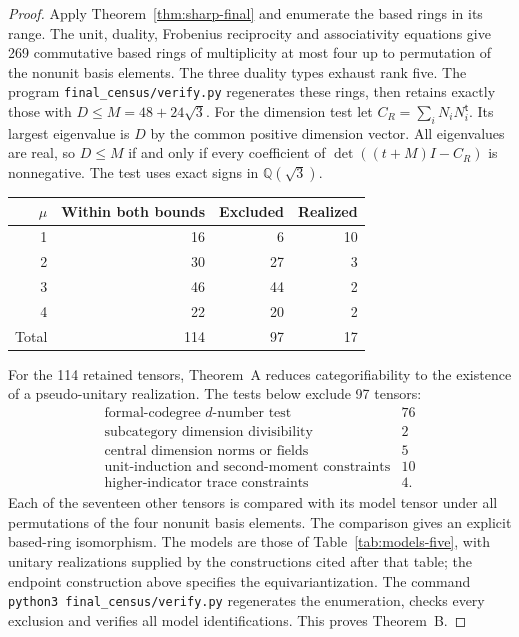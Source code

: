 \documentclass[11pt,a4paper]{article}
\numberwithin{equation}{section}
\begin{document}
\begin{proof}
Apply Theorem~\ref{thm:sharp-final} and enumerate the based rings in its range. The unit, duality, Frobenius reciprocity and associativity equations give 269 commutative based rings of multiplicity at most four up to permutation of the nonunit basis elements. The three duality types exhaust rank five. The program \texttt{final\_census/verify.py} regenerates these rings, then retains exactly those with $D\le M=48+24\sqrt3$. For the dimension test let $C_R=\sum_i N_iN_i^{\mathsf t}$. Its largest eigenvalue is $D$ by the common positive dimension vector. All eigenvalues are real, so $D\le M$ if and only if every coefficient of $\det((t+M)I-C_R)$ is nonnegative. The test uses exact signs in $\mathbb Q(\sqrt3)$.

\begin{center}
\begin{tabular}{rrrr}
\toprule
$\mu$ & Within both bounds & Excluded & Realized\\\midrule
1&16&6&10\\2&30&27&3\\3&46&44&2\\4&22&20&2\\\midrule
Total&114&97&17\\\bottomrule
\end{tabular}
\end{center}
For the 114 retained tensors, Theorem~A reduces categorifiability
to the existence of a pseudo-unitary realization. The tests below
exclude 97 tensors:
\[
\begin{array}{lr}
\text{formal-codegree $d$-number test}&76\\
\text{subcategory dimension divisibility}&2\\
\text{central dimension norms or fields}&5\\
\text{unit-induction and second-moment constraints}&10\\
\text{higher-indicator trace constraints}&4.
\end{array}
\]
Each of the seventeen other tensors is compared with its model tensor
under all permutations of the four nonunit basis elements. The
comparison gives an explicit based-ring isomorphism. The models are
those of Table~\ref{tab:models-five}, with unitary realizations supplied
by the constructions cited after that table; the endpoint construction
above specifies the equivariantization. The command
\texttt{python3 final\_census/verify.py} regenerates the enumeration,
checks every exclusion and verifies all model identifications.
This proves Theorem~B.
\end{proof}
\end{document}
